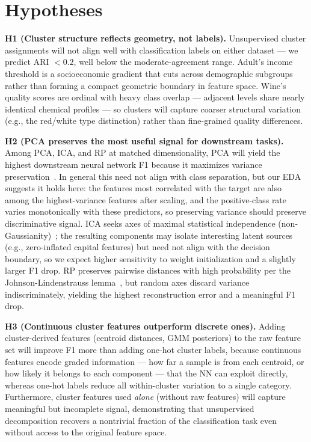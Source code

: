 \documentclass[conference]{IEEEtran}
\begin{document}
\section{Hypotheses}

\textbf{H1 (Cluster structure reflects geometry, not labels).}
Unsupervised cluster assignments will not align well with classification
labels on either dataset --- we predict ARI $< 0.2$, well below the
moderate-agreement range. Adult's income threshold is a
socioeconomic gradient that cuts across demographic subgroups rather
than forming a compact geometric boundary in feature space. Wine's
quality scores are ordinal with heavy class overlap --- adjacent
levels share nearly identical chemical profiles --- so clusters will
capture coarser structural variation (e.g., the red/white type
distinction) rather than fine-grained quality
differences.

\textbf{H2 (PCA preserves the most useful signal for downstream tasks).}
Among PCA, ICA, and RP at matched dimensionality, PCA will yield the
highest downstream neural network F1 because it maximizes variance
preservation~\cite{jolliffe2002}. In general this need not align with
class separation, but our EDA suggests it holds here: the features
most correlated with the target are also among the highest-variance
features after scaling, and the positive-class rate varies
monotonically with these predictors, so preserving variance should
preserve discriminative signal. ICA seeks axes of maximal statistical
independence (non-Gaussianity)~\cite{hyvarinen2000}; the resulting
components may isolate interesting latent sources (e.g., zero-inflated
capital features) but need not align with the decision boundary,
so we expect higher sensitivity to weight initialization and a
slightly larger F1 drop. RP preserves pairwise distances with high
probability per the Johnson-Lindenstrauss
lemma~\cite{dasgupta2003}, but random axes discard variance
indiscriminately, yielding the highest reconstruction error and a
meaningful F1 drop.

\textbf{H3 (Continuous cluster features outperform discrete ones).}
Adding cluster-derived features (centroid distances, GMM posteriors)
to the raw feature set will improve F1 more than adding one-hot
cluster labels, because continuous features encode graded information
--- how far a sample is from each centroid, or how likely it belongs
to each component --- that the NN can exploit directly, whereas
one-hot labels reduce all within-cluster variation to a single
category. Furthermore, cluster features used \emph{alone} (without
raw features) will capture meaningful but incomplete signal,
demonstrating that unsupervised decomposition recovers a nontrivial
fraction of the classification task even without access to the
original feature space.
\end{document}
